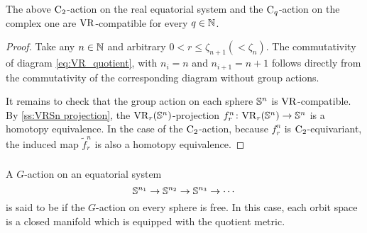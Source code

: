 

\lemma The above \(\mathrm{C}_2\)-action on the real equatorial system and the \(\mathrm{C}_q\)-action on the complex one are \(\mathrm{VR}\)-compatible for every \(q \in \mathbb{N}\).

\begin{proof}
    Take any $n \in \mathbb{N}$ and arbitrary $0 < r \leq \zeta_{n+1} (< \zeta_{n})$.
    The commutativity of diagram \ref{eq:VR_quotient}, with $n_i = n$ and $n_{i+1} = n+1$ follows directly from the commutativity of the corresponding diagram without group actions.

    It remains to check that the group action on each sphere $\mathbb{S}^n$ is \(\mathrm{VR}\)-compatible.
    By \cref{ss:VRSn projection}, the $\mathrm{VR}_r(\mathbb{S}^{n})$-projection $f_r^{n}\colon \mathrm{VR}_r(\mathbb{S}^{n}) \to \mathbb{S}^{n}$ is a homotopy equivalence.
    In the case of the $\mathrm{C}_2$-action, because $f_r^{n}$ is $\mathrm{C}_2$-equivariant, the induced map $\tilde{f}_r^{n}$ is also a homotopy equivalence. 
\end{proof}

\subsubsection{}\label{subsub:foundamental_bar_rpn_lemma}

A \(G\)-action on an equatorial system
\[
\mathbb{S}^{n_1} \to \mathbb{S}^{n_2} \to \mathbb{S}^{n_3} \to \dotsb
\]
is said to be  if the \(G\)-action on every sphere is free.
In this case, each orbit space is a closed manifold which is equipped with the quotient metric.


